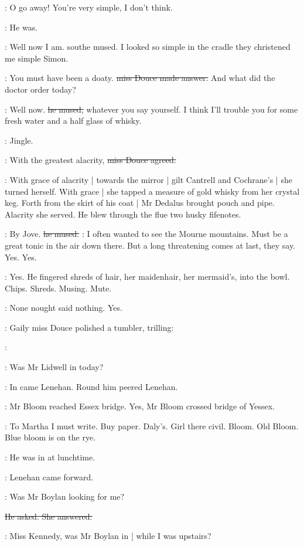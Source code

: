 \MissD:
O go away! You're very simple, I don't think.

:
He was.

\simon:
Well now I am. sout{he mused.}
I looked so simple in the cradle they christened
me simple Simon.

\MissD:
You must have been a doaty.
\sout{miss Douce made answer.}
And what did the doctor order today?

\simon:
Well now.
\sout{he mused,}
whatever you say yourself.
I think I'll trouble you
for some fresh water
and a half glass of whisky.

:
Jingle.

\MissD:
With the greatest alacrity,
\sout{miss Douce agreed.}

:
With grace of alacrity |
towards the mirror |
gilt Cantrell and Cochrane's |
she turned herself.
With grace |
she tapped a measure of gold whisky from her crystal keg.
Forth from the skirt of his coat |
Mr Dedalus brought pouch and pipe.
Alacrity she served.
He blew through the flue two husky fifenotes.

\simon:
By Jove.
\sout{he mused.}
\simon:
I often wanted to see the Mourne mountains.
Must be a great tonic in the air down there.
But a long threatening comes at last,
they say.
Yes.
Yes.

:
Yes.
He fingered shreds of hair,
her maidenhair,
her mermaid's,
into the bowl.
Chips.
Shreds.
Musing.
Mute.

\BloomInt:
None nought said nothing.
Yes.

:
Gaily miss Douce polished a tumbler, trilling:

\MissD:

\lenehan:
Was Mr Lidwell in today?

:
In came Lenehan.
Round him peered Lenehan.

:
Mr Bloom reached Essex bridge.
Yes, Mr Bloom crossed bridge of Yessex.

\BloomInt:
To Martha I must write.
Buy paper.
Daly's.
Girl there civil.
Bloom.
Old Bloom.
Blue bloom is on the rye.

\MissD:
He was in at lunchtime.

:
Lenehan came forward.

\lenehan:
Was Mr Boylan looking for me?

\sout{He asked. She answered:}

\MissD:
Miss Kennedy,
was Mr Boylan in |
while I was upstairs?

